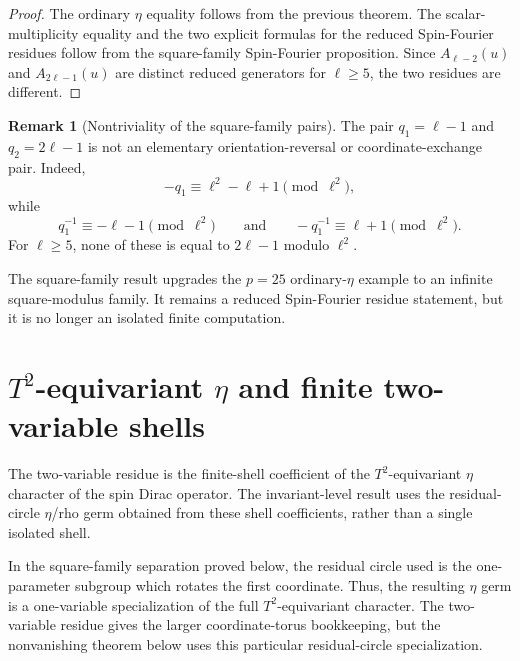 \documentclass{article}
\theoremstyle{definition}
\newtheorem{remark}[remark]{Remark}
\numberwithin{equation}{section}
\begin{document}
\begin{proof}
The ordinary $\eta$ equality follows from the previous theorem.  The scalar-multiplicity equality and the two explicit formulas for the reduced Spin-Fourier residues follow from the square-family Spin-Fourier proposition.  Since $A_{\ell-2}(u)$ and $A_{2\ell-1}(u)$ are distinct reduced generators for $\ell\geq 5$, the two residues are different.
\end{proof}

\begin{remark}[Nontriviality of the square-family pairs]
The pair $q_1=\ell-1$ and $q_2=2\ell-1$ is not an elementary orientation-reversal or coordinate-exchange pair.  Indeed,
\begin{equation}
-q_1\equiv \ell^2-\ell+1\pmod{\ell^2},
\end{equation}
while
\begin{equation}
q_1^{-1}\equiv -\ell-1\pmod{\ell^2}
\qquad\text{and}\qquad
-q_1^{-1}\equiv \ell+1\pmod{\ell^2}.
\end{equation}
For $\ell\geq 5$, none of these is equal to $2\ell-1$ modulo $\ell^2$.
\end{remark}

The square-family result upgrades the $p=25$ ordinary-$\eta$ example to an infinite square-modulus family.  It remains a reduced Spin-Fourier residue statement, but it is no longer an isolated finite computation.


\section{\texorpdfstring{$T^2$-equivariant $\eta$ and finite two-variable shells}{T2-equivariant $\eta$ and finite two-variable shells}}
\label{sec:T2-equivariant-eta}

The two-variable residue is the finite-shell coefficient of the $T^2$-equivariant $\eta$ character of the spin Dirac operator.  The invariant-level result uses the residual-circle $\eta$/rho germ obtained from these shell coefficients, rather than a single isolated shell.

In the square-family separation proved below, the residual circle used is the one-parameter subgroup which rotates the first coordinate. Thus, the resulting $\eta$ germ is a one-variable specialization of the full $T^2$-equivariant character.  The two-variable residue gives the larger coordinate-torus bookkeeping, but the nonvanishing theorem below uses this particular residual-circle specialization.
\end{document}
